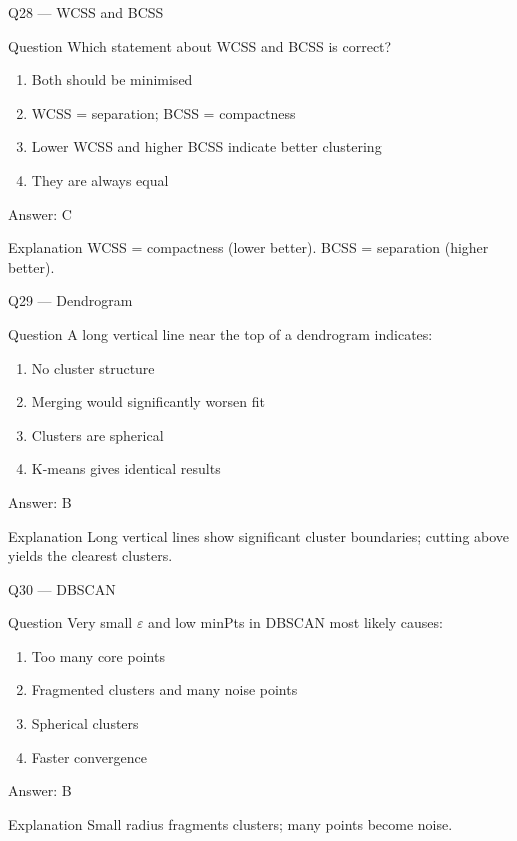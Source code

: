 \documentclass[aspectratio=169,8pt]{beamer}
\begin{document}
	\begin{frame}{Q28 --- WCSS and BCSS}
		\begin{block}{Question}
			Which statement about WCSS and BCSS is correct?
		\end{block}
		\begin{enumerate}
			\item Both should be minimised
			\item WCSS = separation; BCSS = compactness
			\item Lower WCSS and higher BCSS indicate better clustering
			\item They are always equal
		\end{enumerate}
		\begin{exampleblock}{Answer: C}\end{exampleblock}
		\begin{block}{Explanation}
			WCSS = compactness (lower better). BCSS = separation (higher better).
		\end{block}
	\end{frame}
	
	\begin{frame}{Q29 --- Dendrogram}
		\begin{block}{Question}
			A long vertical line near the top of a dendrogram indicates:
		\end{block}
		\begin{enumerate}
			\item No cluster structure
			\item Merging would significantly worsen fit
			\item Clusters are spherical
			\item K-means gives identical results
		\end{enumerate}
		\begin{exampleblock}{Answer: B}\end{exampleblock}
		\begin{block}{Explanation}
			Long vertical lines show significant cluster boundaries; cutting above yields the clearest clusters.
		\end{block}
	\end{frame}
	
	\begin{frame}{Q30 --- DBSCAN}
		\begin{block}{Question}
			Very small $\varepsilon$ and low minPts in DBSCAN most likely causes:
		\end{block}
		\begin{enumerate}
			\item Too many core points
			\item Fragmented clusters and many noise points
			\item Spherical clusters
			\item Faster convergence
		\end{enumerate}
		\begin{exampleblock}{Answer: B}\end{exampleblock}
		\begin{block}{Explanation}
			Small radius fragments clusters; many points become noise.
		\end{block}
	\end{frame}
	
\end{document}
